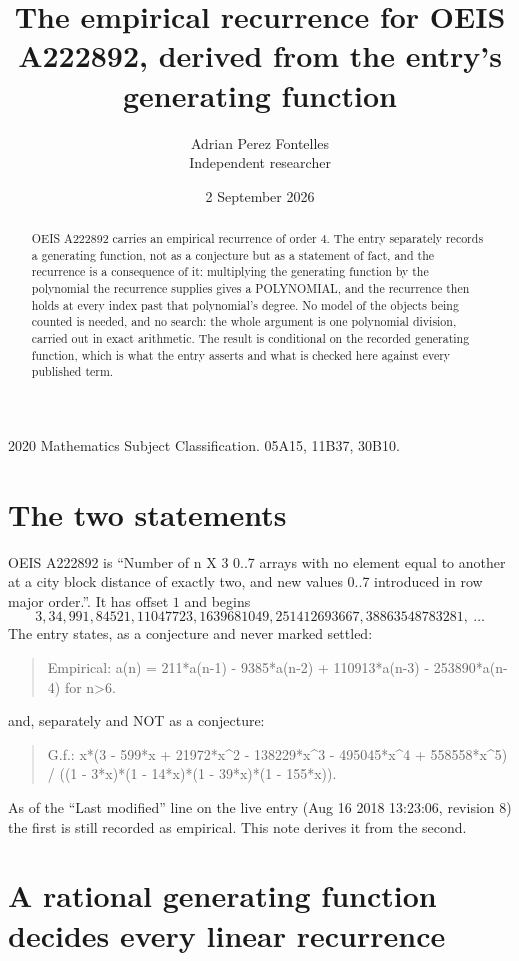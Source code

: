 \documentclass[11pt,a4paper]{article}
\title{The empirical recurrence for OEIS A222892, derived from the entry's generating function}
\author{Adrian Perez Fontelles\\ \small Independent researcher}
\date{2 September 2026}
\theoremstyle{plain}
\theoremstyle{definition}
\begin{document}
\maketitle

\begin{abstract}
OEIS A222892 carries an empirical recurrence of order $4$. The entry separately records a
generating function, not as a conjecture but as a statement of fact, and the recurrence is a
consequence of it: multiplying the generating function by the polynomial the recurrence
supplies gives a POLYNOMIAL, and the recurrence then holds at every index past that
polynomial's degree. No model of the objects being counted is needed, and no search: the
whole argument is one polynomial division, carried out in exact arithmetic. The result is
conditional on the recorded generating function, which is what the entry asserts and what is
checked here against every published term.
\end{abstract}

\noindent\small 2020 Mathematics Subject Classification. 05A15, 11B37, 30B10.\normalsize

\section{The two statements}

OEIS A222892 is ``Number of n X 3 0..7 arrays with no element equal to another at a city block distance of exactly two, and new values 0..7 introduced in row major order.''. It has offset $1$ and begins
\[
3, 34, 991, 84521, 11047723, 1639681049, 251412693667, 38863548783281,\ \dots
\]
The entry states, as a conjecture and never marked settled:
\begin{quote}
Empirical: a(n) = 211*a(n-1) - 9385*a(n-2) + 110913*a(n-3) - 253890*a(n-4) for n>6.
\end{quote}
and, separately and NOT as a conjecture:
\begin{quote}
G.f.: x*(3 - 599*x + 21972*x\^{}2 - 138229*x\^{}3 - 495045*x\^{}4 + 558558*x\^{}5) / ((1 - 3*x)*(1 - 14*x)*(1 - 39*x)*(1 - 155*x)).
\end{quote}
As of the ``Last modified'' line on the live entry (Aug 16 2018 13:23:06, revision 8) the first is still
recorded as empirical. This note derives it from the second.

\section{A rational generating function decides every linear recurrence}
\end{document}
